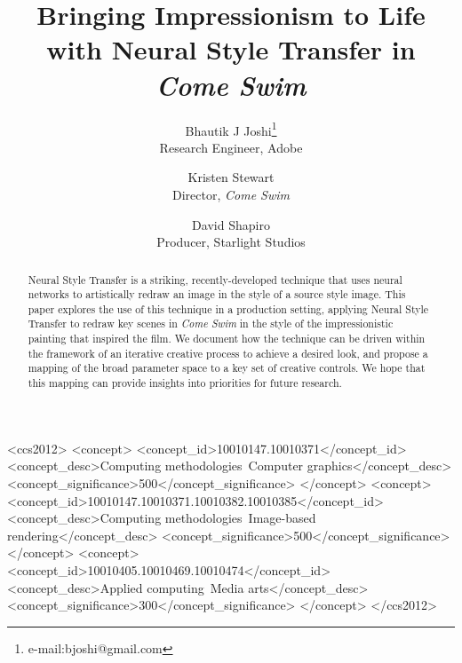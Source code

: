 \documentclass{acmsiggraph}
\title{Bringing Impressionism to Life with Neural Style Transfer in \textit{Come Swim}}
\author{Bhautik J Joshi\thanks{e-mail:bjoshi@gmail.com}\\Research Engineer, Adobe
       \and
       Kristen Stewart\\Director, \textit{Come Swim}
       \and
       David Shapiro\\Producer, Starlight Studios}
\begin{document}

\maketitle



\begin{abstract}

Neural Style Transfer is a striking, recently-developed technique that uses neural networks to artistically redraw an image in the style of a source style image. This paper explores the use of this technique in a production setting, applying Neural Style Transfer to redraw key scenes in \textit{Come Swim} in the style of the impressionistic painting that inspired the film. We document how the technique can be driven within the framework of an iterative creative process to achieve a desired look, and propose a mapping of the broad parameter space to a key set of creative controls. We hope that this mapping can provide insights into priorities for future research.

\end{abstract}

\begin{CCSXML}
<ccs2012>
<concept>
<concept_id>10010147.10010371</concept_id>
<concept_desc>Computing methodologies~Computer graphics</concept_desc>
<concept_significance>500</concept_significance>
</concept>
<concept>
<concept_id>10010147.10010371.10010382.10010385</concept_id>
<concept_desc>Computing methodologies~Image-based rendering</concept_desc>
<concept_significance>500</concept_significance>
</concept>
<concept>
<concept_id>10010405.10010469.10010474</concept_id>
<concept_desc>Applied computing~Media arts</concept_desc>
<concept_significance>300</concept_significance>
</concept>
</ccs2012>
\end{CCSXML}




\keywordlist

\conceptlist

\printcopyright
\end{document}
